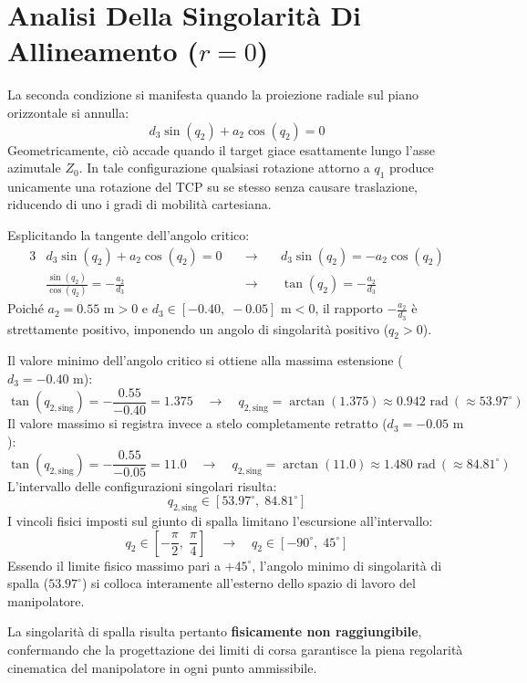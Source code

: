\documentclass[11pt, a4paper]{report}
\begin{document}
\section{Analisi Della Singolarità Di Allineamento ($r = 0$)}
La seconda condizione si manifesta quando la proiezione radiale sul piano orizzontale si annulla:
\[
d_3 \sin(q_2) + a_2 \cos(q_2) = 0
\]
Geometricamente, ciò accade quando il target giace esattamente lungo l'asse azimutale $Z_0$. In tale configurazione qualsiasi rotazione attorno a $q_1$ produce unicamente una rotazione del TCP su se stesso senza causare traslazione, riducendo di uno i gradi di mobilità cartesiana.

Esplicitando la tangente dell'angolo critico:
\begin{alignat*}{3}
    & d_3 \sin(q_2) + a_2 \cos(q_2) = 0 &\quad\longrightarrow\quad & d_3 \sin(q_2) = - a_2 \cos(q_2) \\
    & \frac{\sin(q_{2})}{\cos(q_{2})} = - \frac{a_{2}}{d_{3}} &\quad\longrightarrow\quad & \tan(q_{2}) = - \frac{a_{2}}{d_{3}}
\end{alignat*}
Poiché $a_2 = 0.55\text{ m} > 0$ e $d_3 \in [-0.40, \; -0.05]\text{ m} < 0$, il rapporto $-\frac{a_2}{d_3}$ è strettamente positivo, imponendo un angolo di singolarità positivo ($q_2 > 0$).

Il valore minimo dell'angolo critico si ottiene alla massima estensione ($d_3 = -0.40\text{ m}$):
\[
    \tan(q_{2,\text{sing}}) = -\frac{0.55}{-0.40} = 1.375 \quad\longrightarrow\quad q_{2,\text{sing}} = \arctan(1.375) \approx 0.942\text{ rad} \ (\approx 53.97^\circ)
\]
Il valore massimo si registra invece a stelo completamente retratto ($d_3 = -0.05\text{ m}$):
\[
    \tan(q_{2,\text{sing}}) = -\frac{0.55}{-0.05} = 11.0 \quad\longrightarrow\quad q_{2,\text{sing}} = \arctan(11.0) \approx 1.480\text{ rad} \ (\approx 84.81^\circ)
\]
L'intervallo delle configurazioni singolari risulta:
\[
    q_{2,\text{sing}} \in [53.97^\circ, \; 84.81^\circ]
\]
I vincoli fisici imposti sul giunto di spalla limitano l'escursione all'intervallo:
\[
    q_2 \in \left[-\frac{\pi}{2}, \; \frac{\pi}{4}\right] \quad\longrightarrow\quad q_2 \in [-90^\circ, \; 45^\circ]
\]
Essendo il limite fisico massimo pari a $+45^\circ$, l'angolo minimo di singolarità di spalla ($53.97^\circ$) si colloca interamente all'esterno dello spazio di lavoro del manipolatore.

La singolarità di spalla risulta pertanto \textbf{fisicamente non raggiungibile}, confermando che la progettazione dei limiti di corsa garantisce la piena regolarità cinematica del manipolatore in ogni punto ammissibile.
\end{document}
